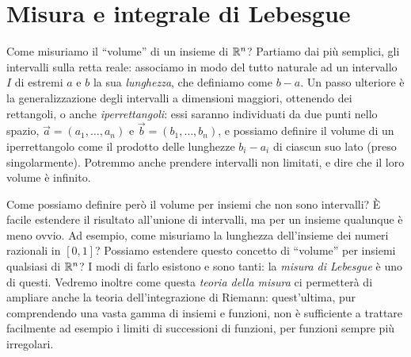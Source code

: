 \chapter{Misura e integrale di Lebesgue}
Come misuriamo il ``volume'' di un insieme di $\mathbb{R}^n$?
Partiamo dai più semplici, gli intervalli sulla retta reale: associamo in modo del tutto naturale ad un intervallo $I$ di estremi $a$ e $b$ la sua \emph{lunghezza}, che definiamo come $b-a$.
Un passo ulteriore è la generalizzazione degli intervalli a dimensioni maggiori, ottenendo dei rettangoli, o anche \emph{iperrettangoli}: essi saranno individuati da due punti nello spazio, $\vec a=(a_1,\dots,a_n)$ e $\vec b=(b_1,\dots,b_n)$, e possiamo definire il volume di un iperrettangolo come il prodotto delle lunghezze $b_i-a_i$ di ciascun suo lato (preso singolarmente).
Potremmo anche prendere intervalli non limitati, e dire che il loro volume è infinito.

Come possiamo definire però il volume per insiemi che non sono intervalli?
È facile estendere il risultato all'unione di intervalli, ma per un insieme qualunque è meno ovvio.
Ad esempio, come misuriamo la lunghezza dell'insieme dei numeri razionali in $[0,1]$?
Possiamo estendere questo concetto di ``volume'' per insiemi qualsiasi di $\mathbb{R}^n$?
I modi di farlo esistono e sono tanti: la \emph{misura di Lebesgue} è uno di questi.
Vedremo inoltre come questa \emph{teoria della misura} ci permetterà di ampliare anche la teoria dell'integrazione di Riemann: quest'ultima, pur comprendendo una vasta gamma di insiemi e funzioni, non è sufficiente a trattare facilmente ad esempio i limiti di successioni di funzioni, per funzioni sempre più irregolari.

